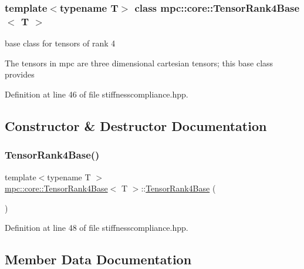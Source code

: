 \subsubsection*{template$<$typename T$>$\newline
class mpc\+::core\+::\+Tensor\+Rank4\+Base$<$ T $>$}

base class for tensors of rank 4 

The tensors in mpc are three dimensional cartesian tensors; this base class provides 

Definition at line 46 of file stiffnesscompliance.\+hpp.



\subsection{Constructor \& Destructor Documentation}
\mbox{\label{structmpc_1_1core_1_1_tensor_rank4_base_acfdbbb57d9d9b43e0fd55b5ecf16658b}} 
\subsubsection{\texorpdfstring{Tensor\+Rank4\+Base()}{TensorRank4Base()}}
{\footnotesize\ttfamily template$<$typename T $>$ \\
\mbox{\hyperlink{structmpc_1_1core_1_1_tensor_rank4_base}{mpc\+::core\+::\+Tensor\+Rank4\+Base}}$<$ T $>$\+::\mbox{\hyperlink{structmpc_1_1core_1_1_tensor_rank4_base}{Tensor\+Rank4\+Base}} (\begin{DoxyParamCaption}{ }\end{DoxyParamCaption})\hspace{0.3cm}{\ttfamily [inline]}}



Definition at line 48 of file stiffnesscompliance.\+hpp.



\subsection{Member Data Documentation}
\mbox{\label{structmpc_1_1core_1_1_tensor_rank4_base_ac599ed36ecac8367b0fa5872160988ed}} 
